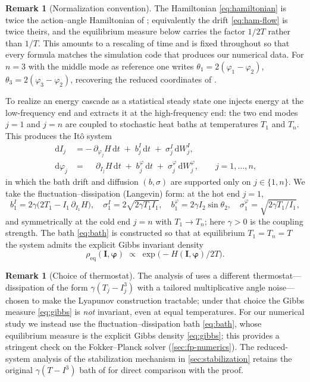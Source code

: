 \documentclass[11pt,a4paper]{article}
\theoremstyle{definition}
\newtheorem{remark}[theorem]{Remark}
\newcommand{\dd}{\,\mathrm{d}}
\numberwithin{equation}{section}   %
\newcommand{\bI}{\mathbf{I}}
\newcommand{\bphi}{\boldsymbol{\varphi}}
\begin{document}
\begin{remark}[Normalization convention]\label{rem:convention}
The Hamiltonian \eqref{eq:hamiltonian} is twice the action--angle Hamiltonian of
\cite{HLNS}; equivalently the drift \eqref{eq:ham-flow} is twice theirs, and the
equilibrium measure below carries the factor $1/2T$ rather than $1/T$. This
amounts to a rescaling of time and is fixed throughout so that every formula
matches the simulation code that produces our numerical data. For $n=3$ with the
middle mode as reference one writes $\theta_1=2(\varphi_1-\varphi_2)$,
$\theta_3=2(\varphi_3-\varphi_2)$, recovering the reduced coordinates of
\cite{HLNS}.
\end{remark}

To realize an energy cascade as a statistical steady state one injects energy at
the low-frequency end and extracts it at the high-frequency end: the two end
modes $j=1$ and $j=n$ are coupled to stochastic heat baths at temperatures $T_1$
and $T_n$. This produces the It\^o system
\begin{align}\label{eq:sde-bulk}
  \dd I_j   &= -\,\partial_{\varphi_j} H \dd t
             \;+\; b^{I}_j \dd t \;+\; \sigma^{I}_j \dd W^{I}_j, \\
  \dd \varphi_j &= \phantom{-}\partial_{I_j} H \dd t
             \;+\; b^{\varphi}_j \dd t \;+\; \sigma^{\varphi}_j \dd W^{\varphi}_j,
             \qquad j = 1,\dots,n, \nonumber
\end{align}
in which the bath drift and diffusion $(b,\sigma)$ are supported only on
$j\in\{1,n\}$. We take the fluctuation--dissipation (Langevin) form: at the hot
end $j=1$,
\begin{equation}\label{eq:bath}
  b^{I}_1 = 2\gamma\big(2T_1 - I_1\,\partial_{I_1}H\big),\quad
  \sigma^{I}_1 = 2\sqrt{2\gamma T_1 I_1},\quad
  b^{\varphi}_1 = 2\gamma I_2 \sin\theta_2,\quad
  \sigma^{\varphi}_1 = \sqrt{2\gamma T_1/I_1},
\end{equation}
and symmetrically at the cold end $j=n$ with $T_1\to T_n$; here $\gamma>0$ is the
coupling strength. The bath \eqref{eq:bath} is constructed so that at equilibrium
$T_1=T_n=T$ the system admits the explicit Gibbs invariant density
\begin{equation}\label{eq:gibbs}
  \rho_{\mathrm{eq}}(\bI,\bphi) \;\propto\; \exp\!\big(-H(\bI,\bphi)/2T\big).
\end{equation}

\begin{remark}[Choice of thermostat]\label{rem:bath}
The analysis of \cite{HLNS} uses a different thermostat---dissipation of the form
$\gamma(T_j-I_j^3)$ with a tailored multiplicative angle noise---chosen to make
the Lyapunov construction tractable; under that choice the Gibbs measure
\eqref{eq:gibbs} is \emph{not} invariant, even at equal temperatures. For our
numerical study we instead use the fluctuation--dissipation bath
\eqref{eq:bath}, whose equilibrium measure is the explicit Gibbs density
\eqref{eq:gibbs}; this provides a stringent check on the Fokker--Planck solver
(\cref{sec:fp-numerics}). The reduced-system analysis of the stabilization
mechanism in \cref{sec:stabilization} retains the original $\gamma(T-I^3)$ bath
of \cite{HLNS} for direct comparison with the proof.
\end{remark}
\end{document}
